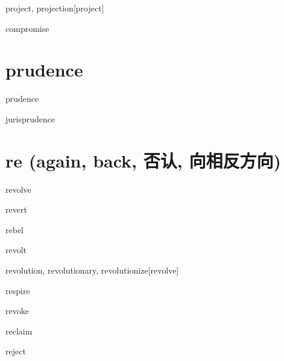 \begin{RefWord}{project, projection}[project]
\end{RefWord}

\begin{RefWord}{compromise}
\end{RefWord}

\section{prudence}

\begin{RefWord}{prudence}
\end{RefWord}

\begin{RefWord}{jurisprudence}
\end{RefWord}

\section{re (again, back, 否认, 向相反方向)}

\begin{RefWord}{revolve}
\end{RefWord}

\begin{RefWord}{revert}
\end{RefWord}

\begin{RefWord}{rebel}
\end{RefWord}

\begin{RefWord}{revolt}
\end{RefWord}

\begin{RefWord}{revolution, revolutionary, revolutionize}[revolve]
\end{RefWord}

\begin{RefWord}{respire}
\end{RefWord}

\begin{RefWord}{revoke}
\end{RefWord}

\begin{RefWord}{reclaim}
\end{RefWord}

\begin{RefWord}{reject}
\end{RefWord}

